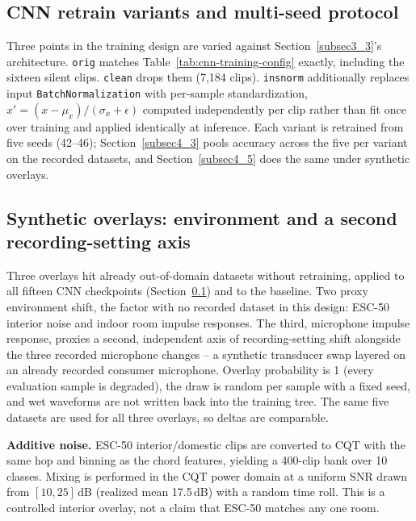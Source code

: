 \documentclass[pdflatex,sn-mathphys-num,iicol]{sn-jnl}
\theoremstyle{thmstyleone}
\theoremstyle{thmstyletwo}
\theoremstyle{thmstylethree}
\begin{document}
\subsection{CNN retrain variants and multi-seed protocol}\label{subsec3_variants}

Three points in the training design are varied against Section~\ref{subsec3_3}'s architecture. \texttt{orig} matches Table~\ref{tab:cnn-training-config} exactly, including the sixteen silent clips. \texttt{clean} drops them (7{,}184 clips). \texttt{insnorm} additionally replaces input \texttt{BatchNormalization} with per-sample standardization, $x' = (x-\mu_x)/(\sigma_x+\epsilon)$ computed independently per clip rather than fit once over training and applied identically at inference. Each variant is retrained from five seeds (42--46); Section~\ref{subsec4_3} pools accuracy across the five per variant on the recorded datasets, and Section~\ref{subsec4_5} does the same under synthetic overlays.

\subsection{Synthetic overlays: environment and a second recording-setting axis}\label{subsec3_7}

Three overlays hit already out-of-domain datasets without retraining, applied to all fifteen CNN checkpoints (Section~\ref{subsec3_variants}) and to the baseline. Two proxy environment shift, the factor with no recorded dataset in this design: ESC-50 interior noise and indoor room impulse responses. The third, microphone impulse response, proxies a second, independent axis of recording-setting shift alongside the three recorded microphone changes -- a synthetic transducer swap layered on an already recorded consumer microphone. Overlay probability is 1 (every evaluation sample is degraded), the draw is random per sample with a fixed seed, and wet waveforms are not written back into the training tree. The same five datasets are used for all three overlays, so deltas are comparable.

\textbf{Additive noise.} ESC-50 interior/domestic clips \cite{Piczak2015} are converted to CQT with the same hop and binning as the chord features, yielding a 400-clip bank over 10 classes. Mixing is performed in the CQT power domain at a uniform SNR drawn from $[10, 25]$\,dB (realized mean 17.5\,dB) with a random time roll. This is a controlled interior overlay, not a claim that ESC-50 matches any one room.
\end{document}
